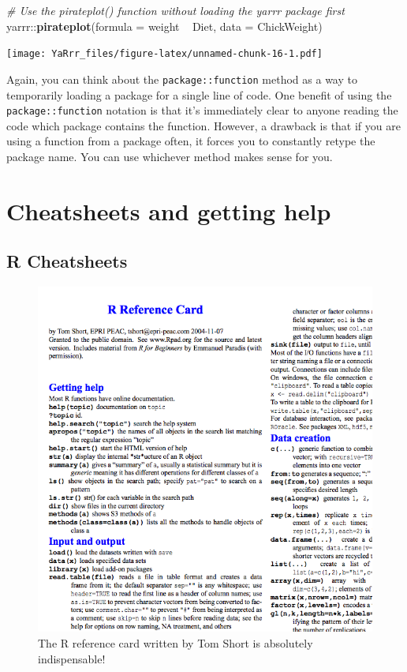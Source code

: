\documentclass[]{book}
\newenvironment{Shaded}{\begin{snugshade}}{\end{snugshade}}
\newcommand{\KeywordTok}[1]{\textcolor[rgb]{0.13,0.29,0.53}{\textbf{{#1}}}}
\newcommand{\DataTypeTok}[1]{\textcolor[rgb]{0.13,0.29,0.53}{{#1}}}
\newcommand{\StringTok}[1]{\textcolor[rgb]{0.31,0.60,0.02}{{#1}}}
\newcommand{\CommentTok}[1]{\textcolor[rgb]{0.56,0.35,0.01}{\textit{{#1}}}}
\newcommand{\NormalTok}[1]{{#1}}
\theoremstyle{definition}
\theoremstyle{definition}
\theoremstyle{remark}
\begin{document}
\begin{Shaded}
\begin{Highlighting}[]
\CommentTok{# Use the pirateplot() function without loading the yarrr package first}
\NormalTok{yarrr::}\KeywordTok{pirateplot}\NormalTok{(}\DataTypeTok{formula =} \NormalTok{weight ~}\StringTok{ }\NormalTok{Diet,}
                  \DataTypeTok{data =} \NormalTok{ChickWeight)}
\end{Highlighting}
\end{Shaded}

\texttt{[image: YaRrr\_files/figure-latex/unnamed-chunk-16-1.pdf]}

Again, you can think about the \texttt{package::function} method as a
way to temporarily loading a package for a single line of code. One
benefit of using the \texttt{package::function} notation is that it's
immediately clear to anyone reading the code which package contains the
function. However, a drawback is that if you are using a function from a
package often, it forces you to constantly retype the package name. You
can use whichever method makes sense for you.

\section{Cheatsheets and getting
help}\label{cheatsheets-and-getting-help}

\subsection{R Cheatsheets}\label{r-cheatsheets}

\begin{figure}

{\centering \includegraphics[width=500px]{images/rreferencess} 

}

\caption{The R reference card written by Tom Short is absolutely indispensable!}\label{fig:rreferencecard}
\end{figure}
\end{document}
